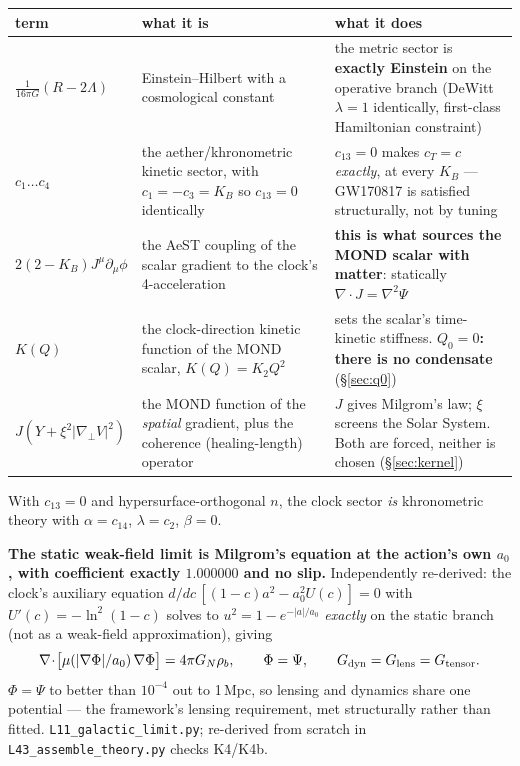 \documentclass[11pt,letterpaper]{article}
\begin{document}
\begin{center}\small
\begin{tabular}{L{0.19\textwidth}L{0.30\textwidth}L{0.40\textwidth}}\toprule
term & what it is & what it does\\\midrule
$\frac{1}{16\pi G}(R-2\Lambda)$ & Einstein--Hilbert with a cosmological constant & the metric sector is \textbf{exactly Einstein} on the operative branch (DeWitt $\lambda=1$ identically, first-class Hamiltonian constraint)\\
$c_1\dots c_4$ & the aether/khronometric kinetic sector, with $c_1=-c_3=K_B$ so $c_{13}=0$ identically & $c_{13}=0$ makes $c_T=c$ \emph{exactly}, at every $K_B$ --- GW170817 \cite{gw170817} is satisfied structurally, not by tuning\\
$2(2-K_B)J^\mu\partial_\mu\phi$ & the AeST coupling of the scalar gradient to the clock's 4-acceleration & \textbf{this is what sources the MOND scalar with matter}: statically $\nabla\!\cdot\!J=\nabla^2\Psi$\\
$K(Q)$ & the clock-direction kinetic function of the MOND scalar, $K(Q)=K_2Q^2$ & sets the scalar's time-kinetic stiffness. \textbf{$Q_0=0$: there is no condensate} (\S\ref{sec:q0})\\
$J(Y+\xi^2|\nabla_\perp V|^2)$ & the MOND function of the \emph{spatial} gradient, plus the coherence (healing-length) operator \cite{z22347632} & $J$ gives Milgrom's law; $\xi$ screens the Solar System. Both are forced, neither is chosen (\S\ref{sec:kernel})\\\bottomrule
\end{tabular}
\end{center}

With $c_{13}=0$ and hypersurface-orthogonal $n$, the clock sector \emph{is} khronometric theory with $\alpha=c_{14}$, $\lambda=c_2$, $\beta=0$.

\textbf{The static weak-field limit is Milgrom's equation at the action's own $a_0$, with coefficient exactly $1.000000$ and no slip.} Independently re-derived: the clock's auxiliary equation $d/dc\,[(1-c)a^2-a_0^2U(c)]=0$ with $U'(c)=-\ln^2(1-c)$ solves to $u^2=1-e^{-|a|/a_0}$ \emph{exactly} on the static branch (not as a weak-field approximation), giving
\begin{equation}
\nabla\!\cdot\!\big[\mu(|\nabla\Phi|/a_0)\,\nabla\Phi\big]=4\pi G_N\rho_b,\qquad \Phi=\Psi,\qquad G_{\rm dyn}=G_{\rm lens}=G_{\rm tensor}.
\end{equation}
$\Phi=\Psi$ to better than $10^{-4}$ out to 1\,Mpc, so lensing and dynamics share one potential --- the framework's lensing requirement, met structurally rather than fitted. \texttt{L11\_galactic\_limit.py}; re-derived from scratch in \texttt{L43\_assemble\_theory.py} checks K4/K4b.
\end{document}
